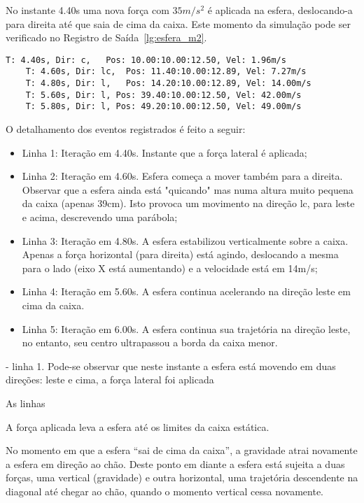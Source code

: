 \documentclass[12pt]{article}
\begin{document}
No instante 4.40s uma nova força com $35m/s^{2}$ é aplicada na esfera, deslocando-a para direita até que saia de cima da caixa. Este momento da simulação pode ser verificado no Registro de Saída~\ref{lg:esfera_m2}. 

\begin{lstlisting}[frame=single,caption=Esfera sobre a caixa. \label{lg:esfera_m2}]
	T: 4.40s, Dir: c, 	Pos: 10.00:10.00:12.50, Vel: 1.96m/s
	T: 4.60s, Dir: lc, 	Pos: 11.40:10.00:12.89, Vel: 7.27m/s
	T: 4.80s, Dir: l, 	Pos: 14.20:10.00:12.89, Vel: 14.00m/s
	T: 5.60s, Dir: l, Pos: 39.40:10.00:12.50, Vel: 42.00m/s
	T: 5.80s, Dir: l, Pos: 49.20:10.00:12.50, Vel: 49.00m/s
\end{lstlisting}

O detalhamento dos eventos registrados é feito a seguir:

\begin{itemize}
	\item Linha 1: Iteração em 4.40s. Instante que a força lateral é aplicada;
	\item Linha 2: Iteração em 4.60s. Esfera começa a mover também para a direita. Observar que a esfera ainda está "quicando" mas numa altura muito pequena da caixa (apenas 39cm). Isto provoca um movimento na direção lc, para leste e acima, descrevendo uma parábola;
	\item Linha 3: Iteração em 4.80s. A esfera estabilizou verticalmente sobre a caixa. Apenas a força horizontal (para direita) está agindo, deslocando a mesma para o lado (eixo X está aumentando) e a velocidade está em 14m/s;
	\item Linha 4: Iteração em 5.60s. A esfera continua acelerando  na direção leste em cima da caixa.
	\item Linha 5: Iteração em 6.00s. A esfera continua sua trajetória na direção leste, no entanto, seu centro ultrapassou a borda da caixa menor.
\end{itemize}

 - linha 1. Pode-se observar que neste instante a esfera está movendo em duas direções: leste e cima, a força lateral foi aplicada 

As linhas 

A força aplicada leva a esfera até os limites da caixa estática. 




No momento em que a esfera “sai de cima da caixa”, a gravidade atrai novamente a esfera em direção ao chão. Deste ponto em diante a esfera está sujeita a duas forças, uma vertical (gravidade) e outra horizontal, uma trajetória descendente na diagonal até chegar ao chão, quando o momento vertical cessa novamente.
\end{document}
